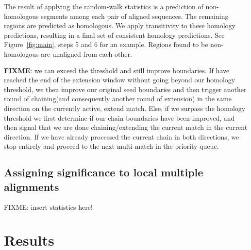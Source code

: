 \documentclass[twoside,11pt]{article}
\begin{document}
The result of applying the random-walk statistics is a prediction of non-homologous segments among each pair of aligned sequences.  The remaining regions are predicted as homologous.  We apply transitivity to these homology predictions, resulting in a final set of consistent homology predictions.  See Figure~\ref{fig:main}, steps 5 and 6 for an example. Regions found to be non-homologous are unaligned from each other.


\textbf{FIXME}: we can exceed the threshold and still improve boundaries.  If have reached the end of the extension window without going beyond our homology threshold, we then improve our original seed boundaries and then trigger another round of chaining(and consequently another round of extension) in the same direction on the currently active, extend match. Else, if we surpass the homology threshold we first determine if our chain boundaries have been improved, and then signal that we are done chaining/extending the current match in the current direction. If we have already processed the current chain in both directions, we stop entirely and proceed to the next multi-match in the priority queue.

\subsection{Assigning significance to local multiple alignments}
FIXME: insert statistics here!



\section{Results}
\end{document}
